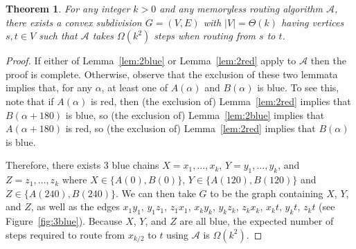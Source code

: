 \documentclass{elsarticle}
\newtheorem{theorem}{Theorem}%
\begin{document}
\begin{theorem}
  \label{thm:quadratic}
  For any integer $k> 0$ and any 
  memoryless routing algorithm $\mathcal{A}$,
  there exists a convex subdivision $G=(V,E)$ with $|V|=\Theta(k)$ having vertices $s,t\in V$ such that $\mathcal{A}$ takes $\Omega(k^2)$ steps when routing from $s$ to $t$.
\end{theorem}

\begin{proof}
If either of Lemma~\ref{lem:2blue} or Lemma~\ref{lem:2red} apply to $\mathcal{A}$ then the proof is complete.  Otherwise, observe that the exclusion of these two lemmata implies that, for any $\alpha$, at least one of $A(\alpha)$ and $B(\alpha)$ is blue.  To see this, note that if $A(\alpha)$ is red, then (the exclusion of) Lemma~\ref{lem:2red} implies that $B(\alpha+180)$ is blue, so (the exclusion of) Lemma~\ref{lem:2blue} implies that $A(\alpha+180)$ is red, so (the exclusion of) Lemma~\ref{lem:2red} implies that $B(\alpha)$ is blue.

Therefore, there exists 3 blue chains $X=x_1,\ldots,x_k$, $Y=y_1,\ldots,y_k$, and $Z=z_1,\ldots,z_k$ where $X\in\{A(0),B(0)\}$, $Y\in\{A(120),B(120)\}$ and $Z\in\{A(240),B(240)\}$.
We can then take $G$ to be the graph containing $X$, $Y$, and $Z$,
as well as the edges $x_1y_1$, $y_1z_1$, $z_1x_1$, $x_ky_k$, $y_kz_k$,
$z_kx_k$, $x_kt$, $y_kt$, $z_kt$ (see Figure~\ref{fig:3blue}).  Because
$X$, $Y$, and $Z$ are all blue, the expected number of steps required
to route from $x_{k/2}$ to $t$ using $\mathcal{A}$ is $\Omega(k^2)$.


\end{proof}
\end{document}
